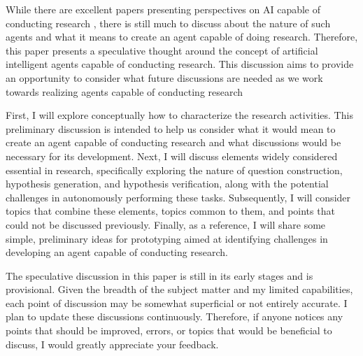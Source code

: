 While there are excellent papers presenting perspectives on AI capable of conducting research \cite{zenil2023future,coley2020autonomous,coley2020autonomousII,kitano2021nobel,wang2023scientific,zenil2023,zhang2023artificial,hope2022computational,national2022automated}, there is still much to discuss about the nature of such agents and what it means to create an agent capable of doing research. Therefore, this paper presents a speculative thought around the concept of artificial intelligent agents capable of conducting research. This discussion aims to provide an opportunity to consider what future discussions are needed as we work towards realizing agents capable of conducting research 

First, I will explore conceptually how to characterize the research activities. This preliminary discussion is intended to help us consider what it would mean to create an agent capable of conducting research and what discussions would be necessary for its development. Next, I will discuss elements widely considered essential in research, specifically exploring the nature of question construction, hypothesis generation, and hypothesis verification, along with the potential challenges in autonomously performing these tasks.  Subsequently, I will consider topics that combine these elements, topics common to them, and points that could not be discussed previously. Finally, as a reference, I will share some simple, preliminary ideas for prototyping aimed at identifying challenges in developing an agent capable of conducting research.

The speculative discussion in this paper is still in its early stages and is provisional. Given the breadth of the subject matter and my limited capabilities, each point of discussion may be somewhat superficial or not entirely accurate. I plan to update these discussions continuously. Therefore, if anyone notices any points that should be improved, errors, or topics that would be beneficial to discuss, I would greatly appreciate your feedback.
